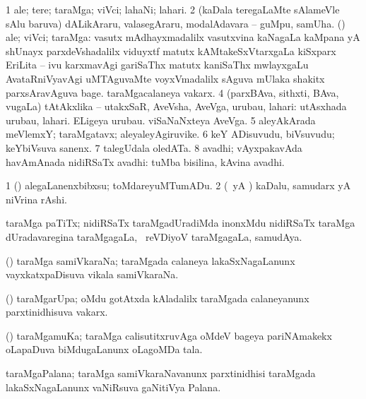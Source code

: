 \bentry
{} 
\gl{\nA}
\expl{}
\bmng
\bnum
\num{1} ale; tere; taraMga; viVci; lahaNi; lahari. 
\num{2} (kaDala teregaLaMte sAlameVle sAlu baruva) dALikAraru, valasegAraru, modalAdavara -- guMpu, samUha. 
 (\Bwvi) ale; viVci; taraMga: 
\banum
{} vasutx mAdhayxmadalilx vasutxvina kaNagaLa kaMpana yA shUnayx parxdeVshadalilx viduyxtf matutx kAMtakeSxVtarxgaLa kiSxparx EriLita -- ivu karxmavAgi gariSaThx matutx kaniSaThx mwlayxgaLu AvataRniVyavAgi uMTAguvaMte voyxVmadalilx sAguva mUlaka shakitx parxsAravAguva bage. 
 taraMgacalaneya vakarx. 
\eanum
\numie
\num{4} (parxBAva, sithxti, BAva, \mo vugaLa) tAtAkxlika -- utakxSaR, AveVsha, AveVga, urubau, lahari:  utAsxhada urubau, lahari.  ELigeya urubau.  viSaNaNxteya AveVga. 
\num{5} aleyAkArada meVlemxY; taraMgatavx; aleyaleyAgiruvike. 
\num{6} keY ADisuvudu, biVsuvudu; keYbiVsuva sanenx. 
\num{7} talegUdala oledATa. 
\num{8} avadhi; vAyxpakavAda havAmAnada nidiRSaTx avadhi:  tuMba bisilina, kAvina avadhi. 
\enum
\emng

\noindent 
\gl{\pagu}
\expl{}
\bmng
\bnum
\num{1}  (\AmA) alegaLanenxbibxsu; toMdareyuMTumADu. 
\num{2}  (\kAparx\ yA \alaMshA) kaDalu, samudarx yA niVrina rAshi. 
\enum
\emng
\eentry

\bentry
{} 
\gl{\nA}
\expl{}
\bmng
taraMga paTiTx; nidiRSaTx taraMgadUradiMda inonxMdu nidiRSaTx taraMga dUradavaregina taraMgagaLa, \kanmu\ reVDiyoV taraMgagaLa, samudAya. 
\emng
\eentry

\bentry
{} 
\gl{\nA}
\expl{}
\bmng
(\Bwvi) taraMga samiVkaraNa; taraMgada calaneya lakaSxNagaLanunx vayxkatxpaDisuva vikala  samiVkaraNa. 
\emng
\eentry

\bentry
{} 
\gl{\nA}
\expl{}
\bmng
(\Bwvi) taraMgarUpa; oMdu gotAtxda kAladalilx taraMgada calaneyanunx parxtinidhisuva vakarx. 
\emng
\eentry

\bentry
{} 
\gl{\nA}
\expl{}
\bmng
(\Bwvi) taraMgamuKa; taraMga calisutitxruvAga oMdeV bageya pariNAmakekx oLapaDuva biMdugaLanunx oLagoMDa tala. 
\emng
\eentry

\bentry
{} 
\gl{\nA}
\expl{}
\bmng
taraMgaPalana; taraMga samiVkaraNavanunx parxtinidhisi taraMgada lakaSxNagaLanunx vaNiRsuva gaNitiVya Palana. 
\emng
\eentry

